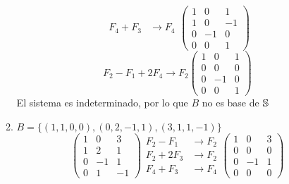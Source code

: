 \documentclass[../practica.root.tex]{subfiles}
\begin{document}
\begin{enumerate}
\begin{enumerate}
\[\begin{array}{rl}
                            F_4 + F_3  & \to F_4
                        \end{array}
                        \begin{pmatrix}
                            1 & 0  & 1  \\
                            1 & 0  & -1 \\
                            0 & -1 & 0  \\
                            0 & 0  & 1
                        \end{pmatrix}
                    \] \[
                        F_2 - F_1 + 2F_4 \to F_2
                        \begin{pmatrix}
                            1 & 0  & 1 \\
                            0 & 0  & 0 \\
                            0 & -1 & 0 \\
                            0 & 0  & 1
                        \end{pmatrix}
                    \]
                    El sistema es indeterminado, por lo que $B$ no es base de $\S$
              \item $B = \{ (1,1,0,0),(0,2,-1,1),(3,1,1,-1) \}$
                    \[
                        \begin{pmatrix}
                            1 & 0  & 3  \\
                            1 & 2  & 1  \\
                            0 & -1 & 1  \\
                            0 & 1  & -1
                        \end{pmatrix}
                        \begin{array}{rl}
                            F_2 - F_1  & \to F_2 \\
                            F_2 + 2F_3 & \to F_2 \\
                            F_4 + F_3  & \to F_4
                        \end{array}
                        \begin{pmatrix}
                            1 & 0  & 3 \\
                            0 & 0  & 0 \\
                            0 & -1 & 1 \\
                            0 & 0  & 0
                        \end{pmatrix}
\]
\end{enumerate}
\end{enumerate}
\end{document}

